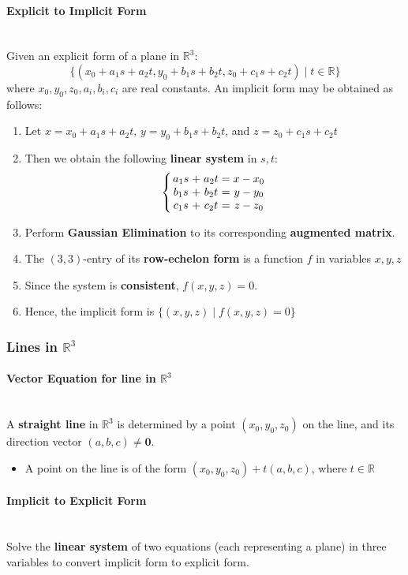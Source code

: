 \documentclass[../ma2001_notes.tex]{subfiles}
\begin{document}
\paragraph{Explicit to Implicit Form}\,\\
Given an explicit form of a plane in \(\mathbb{R}^3\):
\[\{(x_0+a_1s+a_2t, y_0+b_1s+b_2t, z_0+c_1s+c_2t)\mid t\in\mathbb{R}\}\]
where \(x_0,y_0,z_0,a_i,b_i,c_i\) are real constants. An implicit form may be obtained as follows:
\begin{enumerate}
	\item Let \(x=x_0+a_1s+a_2t\), \(y=y_0+b_1s+b_2t\), and \(z=z_0+c_1s+c_2t\)
	\item Then we obtain the following \textbf{linear system} in \(s,t\):
	\[\left\{
	\arraycolsep=1.4pt
	\begin{array}{ccccc}
		a_1s & + & a_2t & = & x-x_0 \\
		b_1s & + & b_2t & = & y-y_0 \\
		c_1s & + & c_2t & = & z-z_0 
	\end{array}\right.
	\]
	\item Perform \textbf{Gaussian Elimination} to its corresponding \textbf{augmented matrix}.
	\item The \((3,3)\)-entry of its \textbf{row-echelon form} is a function \(f\) in variables \(x,y,z\)
	\item Since the system is \textbf{consistent}, \(f(x,y,z)=0\).
	\item Hence, the implicit form is \(\{(x,y,z)\mid f(x,y,z)=0\}\)
\end{enumerate}

\subsubsection{Lines in $\mathbb{R}^3$}
\paragraph{Vector Equation for line in $\mathbb{R}^3$}\,\\
A \textbf{straight line} in \(\mathbb{R}^3\) is determined by a point \((x_0,y_0,z_0)\) on the line, and its direction vector \((a,b,c)\ne\bm{0}\).
\begin{itemize}
	\item A point on the line is of the form \((x_0,y_0,z_0)+t(a,b,c)\), where \(t\in\mathbb{R}\)
\end{itemize}

\paragraph{Implicit to Explicit Form}\,\\
Solve the \textbf{linear system} of two equations (each representing a plane) in three variables to convert implicit form to explicit form.
\end{document}
